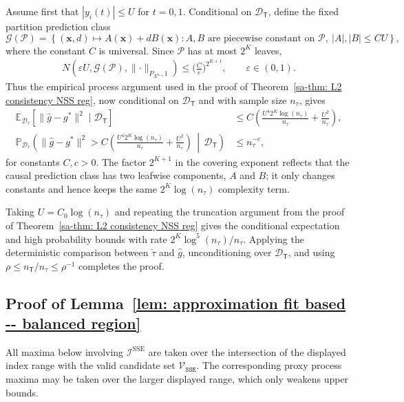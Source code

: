 \documentclass[10pt]{article}
\def\treeT{\mathsf{T}}
\def\bx{\mathbf{x}}
\def\E{\mathbb{E}}
\def\P{\mathbb{P}}
\def\I{\mathscr{I}}
\def\dataD{\mathcal{D}}
\def\partitionP{\mathcal{P}}
\theoremstyle{definition}
\theoremstyle{remark}
\begin{document}
Assume first that $|y_i(t)|\leq U$ for $t=0,1$. Conditional on $\dataD_{\treeT}$, define the fixed partition prediction class
\[
    \mathcal{G}(\partitionP)
    =
    \left\{
        (\bx,d)\mapsto A(\bx)+dB(\bx):
        A,B\text{ are piecewise constant on }\partitionP,\ |A|,|B|\leq CU
    \right\},
\]
where the constant $C$ is universal. Since $\partitionP$ has at most $2^K$ leaves,
\begin{align*}
    N(\varepsilon U,\mathcal{G}(\partitionP),\lVert \cdot \rVert_{P_{X^{n_{\tau}}},1})
    \leq
    \bigg(\frac{C}{\varepsilon}\bigg)^{2^{K+1}},
    \qquad \varepsilon\in(0,1).
\end{align*}
Thus the empirical process argument used in the proof of Theorem~\ref{sa-thm: L2 consistency NSS reg}, now conditional on $\dataD_{\treeT}$ and with sample size $n_{\tau}$, gives
\begin{align*}
    \E_{\dataD_{\tau}}\!\left[\lVert \hat{g}-g^\ast\rVert^2\mid\dataD_{\treeT}\right]
    &\leq
    C\left(
        \frac{U^4 2^K\log(n_{\tau})}{n_{\tau}}
        +
        \frac{U^2}{n_{\tau}}
    \right),\\
    \P_{\dataD_{\tau}}\!\left(
        \lVert \hat{g}-g^\ast\rVert^2
        >
        C\left(
            \frac{U^4 2^K\log(n_{\tau})}{n_{\tau}}
            +
            \frac{U^2}{n_{\tau}}
        \right)
        \,\middle|\,\dataD_{\treeT}
    \right)
    &\leq n_{\tau}^{-c},
\end{align*}
for constants $C,c>0$. The factor $2^{K+1}$ in the covering exponent reflects that the causal prediction class has two leafwise components, $A$ and $B$; it only changes constants and hence keeps the same $2^K\log(n_{\tau})$ complexity term.

Taking $U=C_0\log(n_{\tau})$ and repeating the truncation argument from the proof of Theorem~\ref{sa-thm: L2 consistency NSS reg} gives the conditional expectation and high probability bounds with rate $2^K\log^5(n_{\tau})/n_{\tau}$. Applying the deterministic comparison between $\check \tau$ and $\hat g$, unconditioning over $\dataD_{\treeT}$, and using $\rho \leq n_{\treeT}/n_{\tau} \leq \rho^{-1}$ completes the proof.
 
\subsection{Proof of Lemma~\ref{lem: approximation fit based -- balanced region}}

All maxima below involving $\I^{\text{SSE}}$ are taken over the intersection of the displayed index range with the valid candidate set $\mathcal{V}_{\mathtt{SSE}}$. The corresponding proxy process maxima may be taken over the larger displayed range, which only weakens upper bounds.
\end{document}
